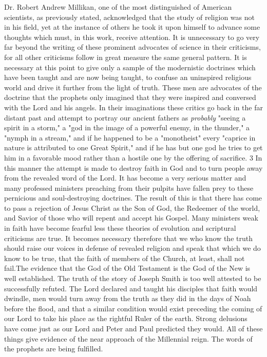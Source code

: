 Dr. Robert Andrew Millikan, one of the most distinguished of American scientists, as
previously stated, acknowledged that the study of religion was not in his field, yet at the
instance of others he took it upon himself to advance some thoughts which must, in this
work, receive attention. It is unnecessary to go very far beyond the writing of these
prominent advocates of science in their criticisms, for all other criticisms follow in great
measure the same general pattern. It is necessary at this point to give only a sample of the
modernistic doctrines which have been taught and are now being taught, to confuse an
uninspired religious world and drive it further from the light of truth. These men are
advocates of the doctrine that the prophets only imagined that they were inspired and
conversed with the Lord and his angels. In their imaginations these critics go back in the far
distant past and attempt to portray our ancient fathers as \textit{probably} "seeing a spirit in a storm,"
a "god in the image of a powerful enemy, in the thunder," a "nymph in a stream," and if he
happened to be a "monotheist" every "caprice in nature is attributed to one Great Spirit," and
if he has but one god he tries to get him in a favorable mood rather than a hostile one by the
offering of sacrifice. 3 In this manner the attempt is made to destroy faith in God and to turn
people away from the revealed word of the Lord. It has become a very serious matter and
many professed ministers preaching from their pulpits have fallen prey to these pernicious
and soul-destroying doctrines. The result of this is that there has come to pass a rejection of
Jesus Christ as the Son of God, the Redeemer of the world, and Savior of those who will
repent and accept his Gospel. Many ministers weak in faith have become fearful less these
theories of evolution and scriptural criticisms are true. It becomes necessary therefore that we
who know the truth should raise our voices in defense of revealed religion and speak that
which we do know to be true, that the faith of members of the Church, at least, shall not fail.The evidence that the God of the Old Testament is the God of the New is well established.
The truth of the story of Joseph Smith is too well attested to be successfully refuted. The
Lord declared and taught his disciples that faith would dwindle, men would turn away from
the truth as they did in the days of Noah before the flood, and that a similar condition would
exist preceding the coming of our Lord to take his place as the rightful Ruler of the earth.
Strong delusions have come just as our Lord and Peter and Paul predicted they would. All of
these things give evidence of the near approach of the Millennial reign. The words of the
prophets are being fulfilled.

